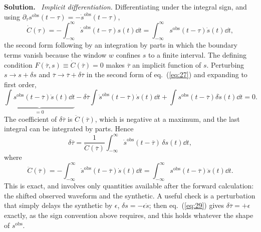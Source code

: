 \documentclass[a4paper,12pt]{paper}
\newenvironment{solution}{\par\noindent\textbf{Solution.}\ }{\par\medskip}
\begin{document}
\begin{solution}
\emph{Implicit differentiation.} Differentiating under the integral sign, and using
$\partial_{\tau}s^{\mathrm{obs}}(t-\tau)=-\dot{s}^{\mathrm{obs}}(t-\tau)$,
\begin{equation}
\dot{C}(\tau)=-\int_{-\infty}^{\infty}\dot{s}^{\mathrm{obs}}(t-\tau)s(t)\dd t=\int_{-\infty}^{\infty}s^{\mathrm{obs}}(t-\tau)\dot{s}(t)\dd t,
\label{eq:27}
\end{equation}
the second form following by an integration by parts in which the boundary terms vanish because the window $w$ confines $s$
to a finite interval. The defining condition $F(\overline{\tau},s)\equiv\dot{C}(\overline{\tau})=0$ makes $\overline{\tau}$ an
implicit function of $s$. Perturbing $s\to s+\delta s$ and $\overline{\tau}\to\overline{\tau}+\delta\overline{\tau}$ in the
second form of eq.~(\ref{eq:27}) and expanding to first order,
\begin{equation}
\underbrace{\int s^{\mathrm{obs}}(t-\overline{\tau})\dot{s}(t)\dd t}_{=0}
-\delta\overline{\tau}\int\dot{s}^{\mathrm{obs}}(t-\overline{\tau})\dot{s}(t)\dd t
+\int s^{\mathrm{obs}}(t-\overline{\tau})\delta\dot{s}(t)\dd t=0.
\label{eq:28}
\end{equation}
The coefficient of $\delta\overline{\tau}$ is $\ddot{C}(\overline{\tau})$, which is negative at a maximum, and the last integral can be
integrated by parts. Hence
\begin{equation}
\delta\overline{\tau}=\frac{1}{\ddot{C}(\overline{\tau})}\int_{-\infty}^{\infty}\dot{s}^{\mathrm{obs}}(t-\overline{\tau})\,\delta s(t)\dd t,
\label{eq:29}
\end{equation}
where
\begin{equation}
\ddot{C}(\overline{\tau})=-\int_{-\infty}^{\infty}\dot{s}^{\mathrm{obs}}(t-\overline{\tau})\dot{s}(t)\dd t
=\int_{-\infty}^{\infty}s^{\mathrm{obs}}(t-\overline{\tau})\ddot{s}(t)\dd t.
\label{eq:30}
\end{equation}
This is exact, and involves only quantities available after the forward calculation: the shifted observed waveform and the
synthetic. A useful check is a perturbation that simply delays the synthetic by $\epsilon$, $\delta s=-\epsilon\dot{s}$; then
eq.~(\ref{eq:29}) gives $\delta\overline{\tau}=+\epsilon$ exactly, as the sign convention above requires, and this holds
whatever the shape of $s^{\mathrm{obs}}$.


\end{solution}
\end{document}
